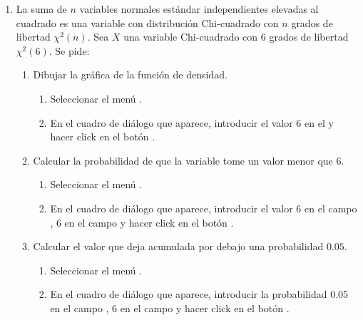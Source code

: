 \begin{enumerate}[leftmargin=*]
\item La suma de $n$ variables normales estándar independientes elevadas al cuadrado es una variable con distribución Chi-cuadrado con $n$
grados de libertad $\chi^2(n)$. 
Sea $X$ una variable Chi-cuadrado con 6 grados de libertad $\chi^2(6)$. 
Se pide:
\begin{enumerate}
\item Dibujar la gráfica de la función de densidad. 
\begin{indicacion}
\begin{enumerate}
\item Seleccionar el menú .
\item En el cuadro de diálogo que aparece, introducir el valor 6 en el  y hacer click en el
botón .
\end{enumerate}
\end{indicacion}

\item Calcular la probabilidad de que la variable tome un valor menor que 6.
\begin{indicacion}
\begin{enumerate}
\item Seleccionar el menú .
\item En el cuadro de diálogo que aparece, introducir el valor $6$ en el campo , 6 en
el campo  y hacer click en el botón .
\end{enumerate}
\end{indicacion}

\item Calcular el valor que deja acumulada por debajo una probabilidad $0.05$.
\begin{indicacion}
\begin{enumerate}
\item Seleccionar el menú .
\item En el cuadro de diálogo que aparece, introducir la probabilidad 0.05 en el campo , 6 en
el campo  y hacer click en el botón .
\end{enumerate}
\end{indicacion}


\end{enumerate}
\end{enumerate}
